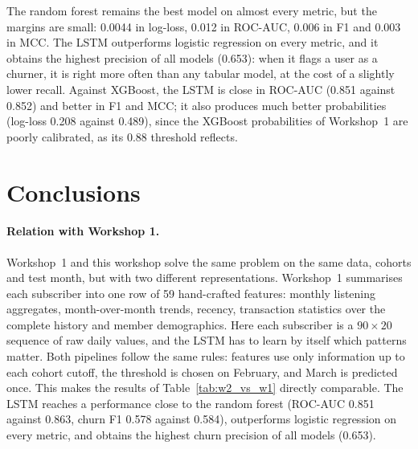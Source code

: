 \documentclass{article}
\begin{document}
The random forest remains the best model on almost every metric, but the margins are small: 0.0044 in log-loss, 0.012 in ROC-AUC, 0.006 in F1 and 0.003 in MCC. The LSTM outperforms logistic regression on every metric, and it obtains the highest precision of all models (0.653): when it flags a user as a churner, it is right more often than any tabular model, at the cost of a slightly lower recall. Against XGBoost, the LSTM is close in ROC-AUC (0.851 against 0.852) and better in F1 and MCC; it also produces much better probabilities (log-loss 0.208 against 0.489), since the XGBoost probabilities of Workshop~1 are poorly calibrated, as its 0.88 threshold reflects.

\section{Conclusions}

\paragraph{Relation with Workshop 1.} Workshop~1 and this workshop solve the same problem on the same data, cohorts and test month, but with two different representations. Workshop~1 summarises each subscriber into one row of 59 hand-crafted features: monthly listening aggregates, month-over-month trends, recency, transaction statistics over the complete history and member demographics. Here each subscriber is a $90 \times 20$ sequence of raw daily values, and the LSTM has to learn by itself which patterns matter. Both pipelines follow the same rules: features use only information up to each cohort cutoff, the threshold is chosen on February, and March is predicted once. This makes the results of Table~\ref{tab:w2_vs_w1} directly comparable. The LSTM reaches a performance close to the random forest (ROC-AUC 0.851 against 0.863, churn F1 0.578 against 0.584), outperforms logistic regression on every metric, and obtains the highest churn precision of all models (0.653).
\end{document}
